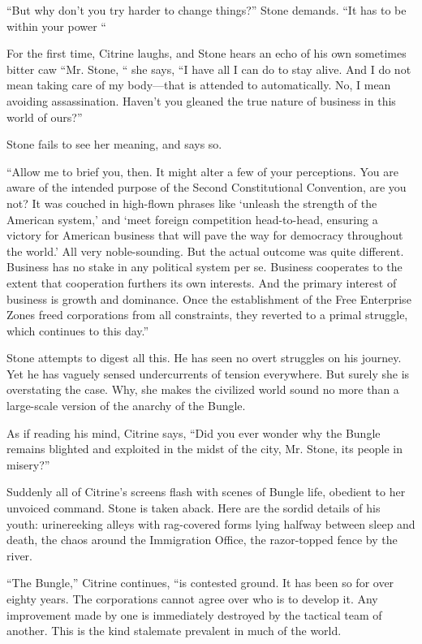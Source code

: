 “But why don’t you try harder to change things?” Stone demands. “It has to be within your power “

For the first time, Citrine laughs, and Stone hears an echo of his own sometimes bitter caw “Mr. Stone, “ she says, “I have all I can do to stay alive. And I do not mean taking care of my body—that is attended to automatically. No, I mean avoiding assassination. Haven’t you gleaned the true nature of business in this world of ours?”

Stone fails to see her meaning, and says so.

“Allow me to brief you, then. It might alter a few of your perceptions. You are aware of the intended purpose of the Second Constitutional Convention, are you not? It was couched in high-flown phrases like ‘unleash the strength of the American system,’ and ‘meet foreign competition head-to-head, ensuring a victory for American business that will pave the way for democracy throughout the world.’ All very noble-sounding. But the actual outcome was quite different. Business has no stake in any political system per se. Business cooperates to the extent that cooperation furthers its own interests. And the primary interest of business is growth and dominance. Once the establishment of the Free Enterprise Zones freed corporations from all constraints, they reverted to a primal struggle, which continues to this day.”

Stone attempts to digest all this. He has seen no overt struggles on his journey. Yet he has vaguely sensed undercurrents of tension everywhere. But surely she is overstating the case. Why, she makes the civilized world sound no more than a large-scale version of the anarchy of the Bungle.

As if reading his mind, Citrine says, “Did you ever wonder why the Bungle remains blighted and exploited in the midst of the city, Mr. Stone, its people in misery?”

Suddenly all of Citrine’s screens flash with scenes of Bungle life, obedient to her unvoiced command. Stone is taken aback. Here are the sordid details of his youth: urinereeking alleys with rag-covered forms lying halfway between sleep and death, the chaos around the Immigration Office, the razor-topped fence by the river.

“The Bungle,” Citrine continues, “is contested ground. It has been so for over eighty years. The corporations cannot agree over who is to develop it. Any improvement made by one is immediately destroyed by the tactical team of another. This is the kind stalemate prevalent in much of the world.

